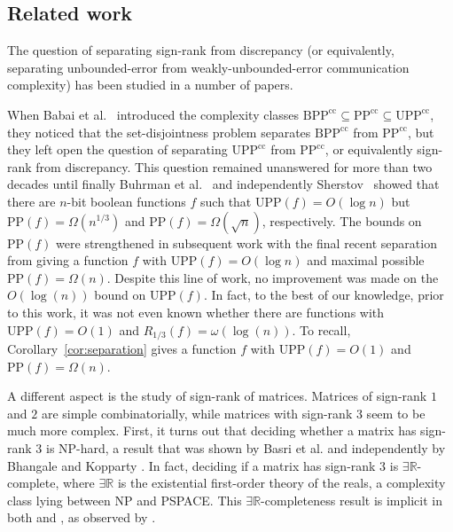 \documentclass[11pt]{article}
\numberwithin{equation}{section}
\theoremstyle{definition}
\theoremstyle{plain}
\newcommand{\R}{\mathbb R}
\theoremstyle{definition}\newtheorem{problem}[theorem]{Problem}\theoremstyle{plain}
\newcommand{\BPP}{\mathrm{BPP}}
\newcommand{\UPP}{\mathrm{UPP}}
\newcommand{\calPP}{\mathrm{PP}}
\newcommand{\cc}{\mathrm{cc}}
\begin{document}
%



%
%
%
%
%
%
%
%

%
%
%
%

%
%
%
%






\subsection{Related work}

The question of separating sign-rank from discrepancy (or equivalently, separating unbounded-error from weakly-unbounded-error communication complexity) has been studied in a number of papers.

When  Babai {et al.}~\cite{babai1986complexity} introduced the complexity classes $\BPP^\cc \subseteq \calPP^\cc \subseteq \UPP^\cc$, they noticed that the   set-disjointness problem separates  $\BPP^\cc$ from $\calPP^\cc$, but they left open the question of separating  $\UPP^\cc$ from $\calPP^\cc$, or equivalently sign-rank from discrepancy. This question  remained unanswered for more than two decades until finally  Buhrman {et al.}~\cite{buhrman2007computation} and independently Sherstov~\cite{sherstov2008halfspace} showed that there are  $n$-bit boolean %
functions  %
$f$ such that $\UPP(f) = O(\log n)$ but $\calPP(f) = \Omega(n^{1/3})$ and $\calPP(f)= \Omega(\sqrt{n})$, respectively. The bounds on $\calPP(f)$  were strengthened in subsequent %
work \cite{sherstov2011pattern,sherstov2013optimal,thaler2016lower,hardestSher}   %
with the final recent separation from \cite{hardestSher} giving a function $f$ with $\UPP(f) = O(\log n)$ and maximal possible $\calPP(f)= \Omega(n)$.  Despite this line of work,  no improvement was made on the $O(\log(n))$ bound on  $\UPP(f)$. In fact, to the best of our knowledge, prior to this work,  it was not even known whether there are functions with $\UPP(f)=O(1)$ and $R_{1/3}(f)=\omega(\log(n))$. To recall, Corollary~\ref{cor:separation} gives a function $f$ with $\UPP(f) = O(1)$ and $\calPP(f)= \Omega(n)$.

A different aspect is the study of sign-rank of matrices. Matrices of sign-rank $1$ and $2$ are simple combinatorially, while matrices with sign-rank $3$ seem to be much more complex. First, it turns out that deciding whether a matrix has sign-rank $3$ is NP-hard, a result that was shown by Basri {et al.} \cite{basri2009visibility} and independently by Bhangale and Kopparty \cite{bhangale2015complexity}. In fact, deciding if a matrix has sign-rank 3 is $\exists \R$-complete, where $\exists \R$ is the existential first-order theory of the reals, a complexity class lying  between NP and PSPACE. This $\exists \R$-completeness result is implicit in both \cite{basri2009visibility} and \cite{bhangale2015complexity}, as observed by \cite{alon2016sign}.
\end{document}
